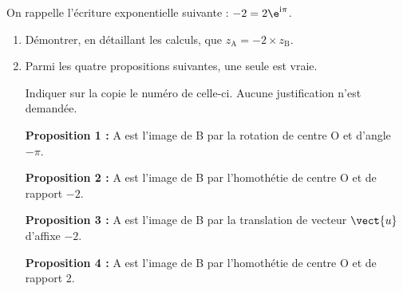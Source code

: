 	On rappelle l'écriture exponentielle suivante : $-2 = 2\e^{\text{i}\pi}$.

\medskip

	\begin{enumerate}
		\item Démontrer, en détaillant les calculs, que $z_{\text{A}} = - 2 \times z_{\text{B}}$.
		\item Parmi les quatre propositions suivantes, une seule est vraie.

		Indiquer sur la copie le numéro de celle-ci. Aucune justification n'est demandée.

		\medskip

		\textbf{Proposition 1 :} A est l'image de B par la rotation de centre O et d'angle $- \pi$.

		\textbf{Proposition 2 :} A est l'image de B par l'homothétie de centre O et de rapport $-2$.

		\textbf{Proposition 3 :} A est l'image de B par la translation de vecteur $\vect{u}$ d'affixe $-2$.

		\textbf{Proposition 4 :} A est l'image de B par l'homothétie de centre O et de rapport 2.

	\end{enumerate}

